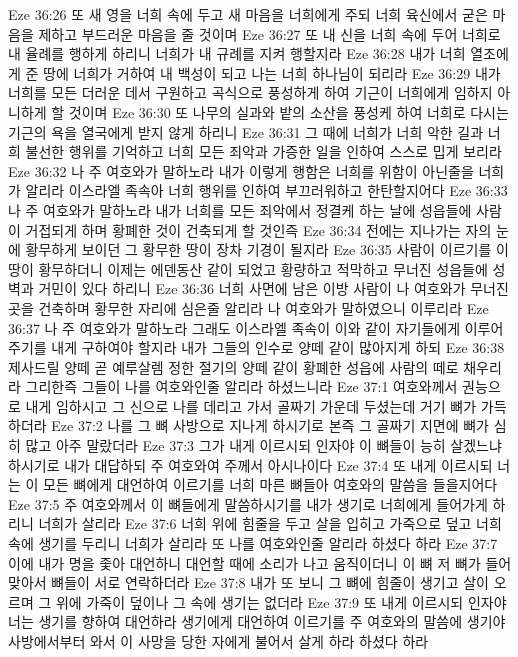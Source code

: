 Eze 36:26  또 새 영을 너희 속에 두고 새 마음을 너희에게 주되 너희 육신에서 굳은 마음을 제하고 부드러운 마음을 줄 것이며
Eze 36:27  또 내 신을 너희 속에 두어 너희로 내 율례를 행하게 하리니 너희가 내 규례를 지켜 행할지라
Eze 36:28  내가 너희 열조에게 준 땅에 너희가 거하여 내 백성이 되고 나는 너희 하나님이 되리라
Eze 36:29  내가 너희를 모든 더러운 데서 구원하고 곡식으로 풍성하게 하여 기근이 너희에게 임하지 아니하게 할 것이며
Eze 36:30  또 나무의 실과와 밭의 소산을 풍성케 하여 너희로 다시는 기근의 욕을 열국에게 받지 않게 하리니
Eze 36:31  그 때에 너희가 너희 악한 길과 너희 불선한 행위를 기억하고 너희 모든 죄악과 가증한 일을 인하여 스스로 밉게 보리라
Eze 36:32  나 주 여호와가 말하노라 내가 이렇게 행함은 너희를 위함이 아닌줄을 너희가 알리라 이스라엘 족속아 너희 행위를 인하여 부끄러워하고 한탄할지어다
Eze 36:33  나 주 여호와가 말하노라 내가 너희를 모든 죄악에서 정결케 하는 날에 성읍들에 사람이 거접되게 하며 황폐한 것이 건축되게 할 것인즉
Eze 36:34  전에는 지나가는 자의 눈에 황무하게 보이던 그 황무한 땅이 장차 기경이 될지라
Eze 36:35  사람이 이르기를 이 땅이 황무하더니 이제는 에덴동산 같이 되었고 황량하고 적막하고 무너진 성읍들에 성벽과 거민이 있다 하리니
Eze 36:36  너희 사면에 남은 이방 사람이 나 여호와가 무너진 곳을 건축하며 황무한 자리에 심은줄 알리라 나 여호와가 말하였으니 이루리라
Eze 36:37  나 주 여호와가 말하노라 그래도 이스라엘 족속이 이와 같이 자기들에게 이루어 주기를 내게 구하여야 할지라 내가 그들의 인수로 양떼 같이 많아지게 하되
Eze 36:38  제사드릴 양떼 곧 예루살렘 정한 절기의 양떼 같이 황폐한 성읍에 사람의 떼로 채우리라 그리한즉 그들이 나를 여호와인줄 알리라 하셨느니라
Eze 37:1  여호와께서 권능으로 내게 임하시고 그 신으로 나를 데리고 가서 골짜기 가운데 두셨는데 거기 뼈가 가득하더라
Eze 37:2  나를 그 뼈 사방으로 지나게 하시기로 본즉 그 골짜기 지면에 뼈가 심히 많고 아주 말랐더라
Eze 37:3  그가 내게 이르시되 인자야 이 뼈들이 능히 살겠느냐 하시기로 내가 대답하되 주 여호와여 주께서 아시나이다
Eze 37:4  또 내게 이르시되 너는 이 모든 뼈에게 대언하여 이르기를 너희 마른 뼈들아 여호와의 말씀을 들을지어다
Eze 37:5  주 여호와께서 이 뼈들에게 말씀하시기를 내가 생기로 너희에게 들어가게 하리니 너희가 살리라
Eze 37:6  너희 위에 힘줄을 두고 살을 입히고 가죽으로 덮고 너희 속에 생기를 두리니 너희가 살리라 또 나를 여호와인줄 알리라 하셨다 하라
Eze 37:7  이에 내가 명을 좇아 대언하니 대언할 때에 소리가 나고 움직이더니 이 뼈 저 뼈가 들어 맞아서 뼈들이 서로 연락하더라
Eze 37:8  내가 또 보니 그 뼈에 힘줄이 생기고 살이 오르며 그 위에 가죽이 덮이나 그 속에 생기는 없더라
Eze 37:9  또 내게 이르시되 인자야 너는 생기를 향하여 대언하라 생기에게 대언하여 이르기를 주 여호와의 말씀에 생기야 사방에서부터 와서 이 사망을 당한 자에게 불어서 살게 하라 하셨다 하라
